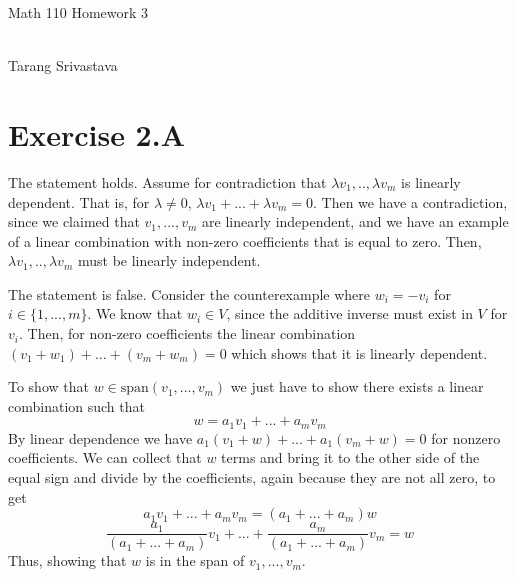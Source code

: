 \documentclass[10pt, twocolumn]{article}
\author{Tarang Srivastava}
\newcommand{\vspan}{\text{span}}
\newcommand{\makechaptertitle}[1]{
\begin{center}
	\begin{large}
		#1
	\end{large}
	\begin{small}
		\\Tarang Srivastava
	\end{small}
\end{center}
}
\begin{document}
	
\makechaptertitle{Math 110 Homework 3}

\section{Exercise 2.A}
\begin{q}[Problem 8]
    The statement holds. 
    Assume for contradiction that $ \lambda v_1, .., \lambda v_m $ is linearly dependent. 
    That is, for $ \lambda \neq 0 $, $ \lambda v_1 +  ... + \lambda v_m = 0 $. 
    Then we have a contradiction, since we claimed that $ v_1, ..., v_m $ are linearly independent,
    and we have an example of a linear combination with non-zero coefficients that is equal to zero. 
    Then, $ \lambda v_1, .., \lambda v_m $ must be linearly independent.
\end{q}
\begin{q}[Problem 9]
    The statement is false. 
    Consider the counterexample where $ w_i = -v_i $ for $ i \in \{1, ..., m\} $. 
    We know that $ w_i \in V $, since the additive inverse must exist in $ V $ for $ v_i $. 
    Then, for non-zero coefficients the linear combination $ (v_1 + w_1) +  ... + (v_m + w_m) = 0 $ 
    which shows that it is linearly dependent.
\end{q}
\begin{q}[Problem 10]
    To show that $ w \in \vspan(v_1, ..., v_m) $ we just have to show there exists a linear combination 
    such that $$ w = a_1v_1 + ...+ a_m v_m $$ 
    By linear dependence we have $ a_1(v_1 + w) + ... + a_1(v_m + w) = 0 $ for nonzero coefficients. 
    We can collect that $ w $ terms and bring it to the other side of the equal sign and divide by the coefficients, again because they are not all zero, to get
    $$ a_1 v_1 + ... + a_m v_m = (a_1 + ... + a_m) w $$ 
    $$ \frac{a_1}{(a_1 + ... + a_m)} v_1 + ... + \frac{a_m}{(a_1 + ... + a_m)} v_m = w $$
    Thus, showing that $ w $ is in the span of $ v_1, ..., v_m $. 
\end{q}
\begin{q}[Problem 11]
      
\end{q}
\end{document}
